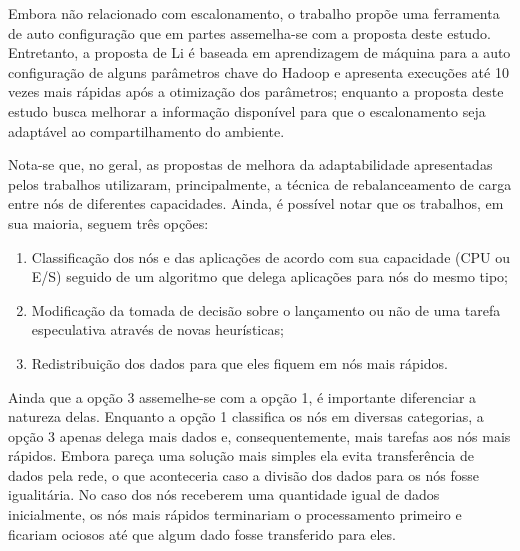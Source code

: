 Embora não relacionado com escalonamento, o trabalho \cite{Li} propõe uma ferramenta de auto configuração que em partes assemelha-se com a proposta deste estudo. Entretanto, a proposta de Li é baseada em aprendizagem de máquina para a auto configuração de alguns parâmetros chave do Hadoop e apresenta execuções até 10 vezes mais rápidas após a otimização dos parâmetros; enquanto a proposta deste estudo busca melhorar a informação disponível para que o escalonamento seja adaptável ao compartilhamento do ambiente.

Nota-se que, no geral, as propostas de melhora da adaptabilidade apresentadas pelos trabalhos utilizaram, principalmente, a técnica de rebalanceamento de carga entre nós de diferentes capacidades. Ainda, é possível notar que os trabalhos, em sua maioria, seguem três opções:

\begin{enumerate}
	\item Classificação dos nós e das aplicações de acordo com sua capacidade (CPU ou E/S) seguido de um algoritmo que delega aplicações para nós do mesmo tipo;
	\item Modificação da tomada de decisão sobre o lançamento ou não de uma tarefa especulativa através de novas heurísticas;
	\item Redistribuição dos dados para que eles fiquem em nós mais rápidos.
\end{enumerate}

Ainda que a opção 3 assemelhe-se com a opção 1, é importante diferenciar a natureza delas. Enquanto a opção 1 classifica os nós em diversas categorias, a opção 3 apenas delega mais dados e, consequentemente, mais tarefas aos nós mais rápidos. Embora pareça uma solução mais simples ela evita transferência de dados pela rede, o que aconteceria caso a divisão dos dados para os nós fosse igualitária. No caso dos nós receberem uma quantidade igual de dados inicialmente, os nós mais rápidos terminariam o processamento primeiro e ficariam ociosos até que algum dado fosse transferido para eles.

